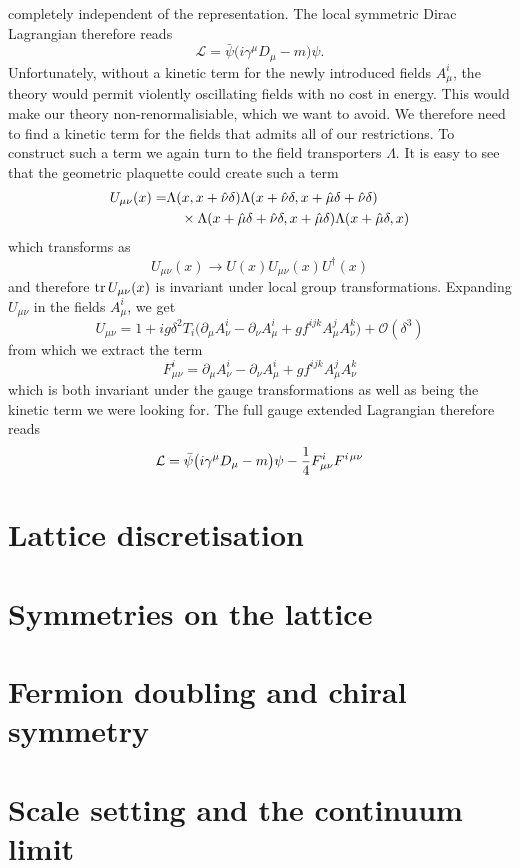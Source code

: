 %
completely independent of the representation. The local symmetric Dirac
Lagrangian therefore reads
%
\begin{equation}
  \mathcal{L} = \bar{\psi}\big(i \gamma^{\mu} D_{\mu} - m\big) \psi.
\end{equation}
%
Unfortunately, without a kinetic term for the newly introduced fields
$A^i_{\mu}$, the theory would permit violently oscillating fields with no cost
in energy. This would make our theory non-renormalisiable, which we want to
avoid.  We therefore need to find a kinetic term for the fields that admits all
of our restrictions. To construct such a term we again turn to the field
transporters $\Lambda$. It is easy to see that the geometric plaquette could
create such a term
%
\begin{align}
  U_{\mu\nu}(x) =& \Lambda(x, x + \hat{\nu} \delta)
    \Lambda(x + \hat{\nu} \delta, x + \hat{\mu} \delta + \hat{\nu} \delta) \nonumber\\
    &\hskip1em\times\Lambda(x + \hat{\mu} \delta + \hat{\nu}\delta, x + \hat{\mu} \delta)
    \Lambda(x + \hat{\mu}\delta, x)
\end{align}
%
which transforms as
%
\begin{equation}
  U_{\mu\nu}(x) \to U(x) U_{\mu\nu}(x) U^{\dagger}(x)
\end{equation}
%
and therefore $\operatorname{tr} U_{\mu\nu}(x)$ is invariant under local group
transformations. Expanding $U_{\mu\nu}$ in the fields $A^i_{\mu}$, we get
%
\begin{equation}
  U_{\mu\nu} = 1 + i g \delta^2 T_i \big( \partial_{\mu} A^i_{\nu} - \partial_{\nu}
  A^i_{\mu} + g f^{ijk} A^j_{\mu} A^k_{\nu} \big) + \mathcal{O}(\delta^3)
\end{equation}
%
from which we extract the term
%
\begin{equation}
  F_{\mu\nu}^i = \partial_{\mu} A^i_{\nu} - \partial_{\nu}
    A^i_{\mu} + g f^{ijk} A^j_{\mu} A^k_{\nu}
\end{equation}
%
which is both invariant under the gauge transformations as well as being the
kinetic term we were looking for. The full gauge extended Lagrangian therefore
reads
\begin{equation}
  \mathcal{L} = \bar{\psi}\big(i \gamma^{\mu} D_{\mu} - m\big)\psi
    - \frac{1}{4} F^i_{\mu\nu} F^{i\hskip.2ex\mu\nu}
\end{equation}





\section{Lattice discretisation} \label{sec:lattice_intro}

\section{Symmetries on the lattice} \label{sec:lattice_symmetries}

\section{Fermion doubling and chiral symmetry} \label{sec:fermion_doubling}

\section{Scale setting and the continuum limit} \label{sec:scale_setting}

